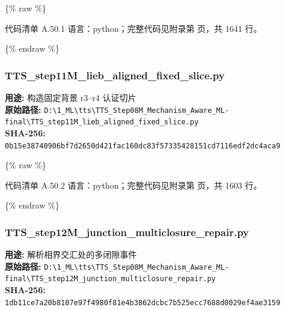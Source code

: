 \documentclass[lang=cn,scheme=chinese,color=blue,device=normal,toc=onecol,math=cm]{elegantbook}
\begin{document}
\{\% raw \%\}\par


\begin{codeindexbox}{代码清单 A.50.1}
语言：python；完整代码见附录第 \pageref{code:50:1} 页，共 1641 行。
\end{codeindexbox}


\{\% endraw \%\}\par


\subsubsection{TTS\_\allowbreak{}step11M\_\allowbreak{}lieb\_\allowbreak{}aligned\_\allowbreak{}fixed\_\allowbreak{}slice.py}


\textbf{用途:} 构造固定背景 r3–r4 认证切片\\ \textbf{原始路径:} \texttt{D:\textbackslash{}\allowbreak{}1\_\allowbreak{}ML\textbackslash{}\allowbreak{}tts\textbackslash{}\allowbreak{}TTS\_\allowbreak{}Step08M\_\allowbreak{}Mechanism\_\allowbreak{}Aware\_\allowbreak{}ML-final\textbackslash{}\allowbreak{}TTS\_\allowbreak{}step11M\_\allowbreak{}lieb\_\allowbreak{}aligned\_\allowbreak{}fixed\_\allowbreak{}slice.py}\\ \textbf{SHA-256:} \texttt{0b15e38740906bf7d2650d421fac160dc83f57335428151cd7116edf2dc4aca9}\par


\{\% raw \%\}\par


\begin{codeindexbox}{代码清单 A.50.2}
语言：python；完整代码见附录第 \pageref{code:50:2} 页，共 1603 行。
\end{codeindexbox}


\{\% endraw \%\}\par


\subsubsection{TTS\_\allowbreak{}step12M\_\allowbreak{}junction\_\allowbreak{}multiclosure\_\allowbreak{}repair.py}


\textbf{用途:} 解析相界交汇处的多闭隙事件\\ \textbf{原始路径:} \texttt{D:\textbackslash{}\allowbreak{}1\_\allowbreak{}ML\textbackslash{}\allowbreak{}tts\textbackslash{}\allowbreak{}TTS\_\allowbreak{}Step08M\_\allowbreak{}Mechanism\_\allowbreak{}Aware\_\allowbreak{}ML-final\textbackslash{}\allowbreak{}TTS\_\allowbreak{}step12M\_\allowbreak{}junction\_\allowbreak{}multiclosure\_\allowbreak{}repair.py}\\ \textbf{SHA-256:} \texttt{1db11ce7a20b8107e97f4980f81e4b3862dcbc7b525ecc7688d0029ef4ae3159}\par
\end{document}
